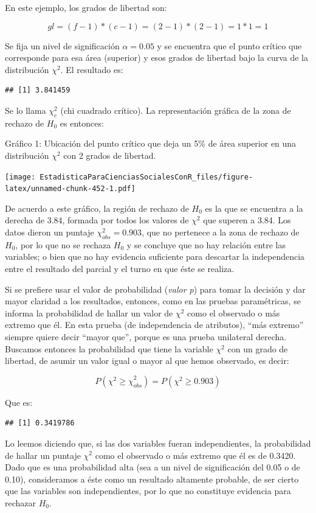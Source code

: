 \documentclass[]{book}
\begin{document}
En este ejemplo, los grados de libertad son:

\[gl = (f - 1)*(c - 1) = (2 - 1)*(2 - 1) = 1*1 = 1\]

Se fija un nivel de significación \(\alpha = 0.05\) y se
encuentra que el punto crítico que corresponde para esa área (superior)
y esos grados de libertad bajo la curva de la distribución \(\chi^{2}\). El resultado es:

\begin{verbatim}
## [1] 3.841459
\end{verbatim}

Se lo llama \(\chi^{2}_{c}\) (chi cuadrado crítico). La
representación gráfica de la zona de rechazo de \(H_0\) es entonces:

Gráfico 1: Ubicación del punto crítico que deja un 5\% de área superior
en una distribución \(\chi^{2}\) con 2 grados de libertad.

\texttt{[image: EstadisticaParaCienciasSocialesConR\_files/figure-latex/unnamed-chunk-452-1.pdf]}

De acuerdo a este gráfico, la región de rechazo de \(H_0\) es la que se
encuentra a la derecha de 3.84, formada por todos los valores de
\(\chi^{2}\) que superen a 3.84. Los datos dieron un puntaje
\(\chi_{obs}^{2} = 0.903\), que no pertenece a la zona de rechazo de
\(H_0\), por lo que no se rechaza \(H_0\) y se concluye que no hay relación
entre las variables; o bien que no hay evidencia suficiente para
descartar la independencia entre el resultado del parcial y el turno en
que éste se realiza.

Si se prefiere usar el valor de probabilidad (\emph{valor p}) para tomar la
decisión y dar mayor claridad a los resultados, entonces, como en las
pruebas paramétricas, se informa la probabilidad de hallar un valor de
\(\chi^{2}\) como el observado o más extremo que él. En esta prueba (de
independencia de atributos), ``más extremo'' siempre quiere decir ``mayor
que'', porque es una prueba unilateral derecha. Buscamos entonces la
probabilidad que tiene la variable \(\chi^{2}\) con un grado de
libertad, de asumir un valor igual o mayor al que hemos observado, es
decir:

\[P(\chi^{2}{\geq \chi}_{obs}^{2}) = P(\chi^{2} \geq 0.903)\]

Que es:

\begin{verbatim}
## [1] 0.3419786
\end{verbatim}

Lo leemos diciendo
que, si las dos variables fueran independientes, la probabilidad de
hallar un puntaje \(\chi^{2}\) como el observado o más extremo que él es
de 0.3420. Dado que es una probabilidad alta (sea a un nivel de
significación del 0.05 o de 0.10), consideramos a éste como un resultado
altamente probable, de ser cierto que las variables son independientes, por lo que no constituye evidencia para rechazar \(H_0\).
\end{document}
